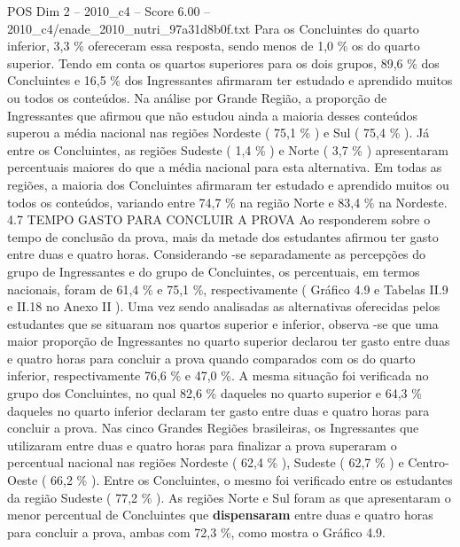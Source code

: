 \begin{textsample}{POS Dim 2 – 2010\_c4 – Score 6.00 – 2010\_c4/enade\_2010\_nutri\_97a31d8b0f.txt}
Para os Concluintes do quarto inferior, 3,3 \% ofereceram essa resposta, sendo menos de 1,0 \% os do quarto superior.
Tendo em conta os quartos superiores para os dois grupos, 89,6 \% dos Concluintes e 16,5 \% dos Ingressantes afirmaram ter estudado e aprendido muitos ou todos os conteúdos.
Na análise por Grande Região, a proporção de Ingressantes que afirmou que não estudou ainda a maioria desses conteúdos superou a média nacional nas regiões Nordeste ( 75,1 \% ) e Sul ( 75,4 \% ).
Já entre os Concluintes, as regiões Sudeste ( 1,4 \% ) e Norte ( 3,7 \% ) apresentaram percentuais maiores do que a média nacional para esta alternativa.
Em todas as regiões, a maioria dos Concluintes afirmaram ter estudado e aprendido muitos ou todos os conteúdos, variando entre 74,7 \% na região Norte e 83,4 \% na Nordeste. 4.7 TEMPO GASTO PARA CONCLUIR A PROVA Ao responderem sobre o tempo de conclusão da prova, mais da metade dos estudantes afirmou ter gasto entre duas e quatro horas.
Considerando -se separadamente as percepções do grupo de Ingressantes e do grupo de Concluintes, os percentuais, em termos nacionais, foram de 61,4 \% e 75,1 \%, respectivamente ( Gráfico 4.9 e Tabelas II.9 e II.18 no Anexo II ).
Uma vez sendo analisadas as alternativas oferecidas pelos estudantes que se situaram nos quartos superior e inferior, observa -se que uma maior proporção de Ingressantes no quarto superior declarou ter gasto entre duas e quatro horas para concluir a prova quando comparados com os do quarto inferior, respectivamente 76,6 \% e 47,0 \%.
A mesma situação foi verificada no grupo dos Concluintes, no qual 82,6 \% daqueles no quarto superior e 64,3 \% daqueles no quarto inferior declaram ter gasto entre duas e quatro horas para concluir a prova.
Nas cinco Grandes Regiões brasileiras, os Ingressantes que utilizaram entre duas e quatro horas para finalizar a prova superaram o percentual nacional nas regiões Nordeste ( 62,4 \% ), Sudeste ( 62,7 \% ) e Centro-Oeste ( 66,2 \% ).
Entre os Concluintes, o mesmo foi verificado entre os estudantes da região Sudeste ( 77,2 \% ).
As regiões Norte e Sul foram as que apresentaram o menor percentual de Concluintes que \textbf{dispensaram} entre duas e quatro horas para concluir a prova, ambas com 72,3 \%, como mostra o Gráfico 4.9.

\end{textsample}
